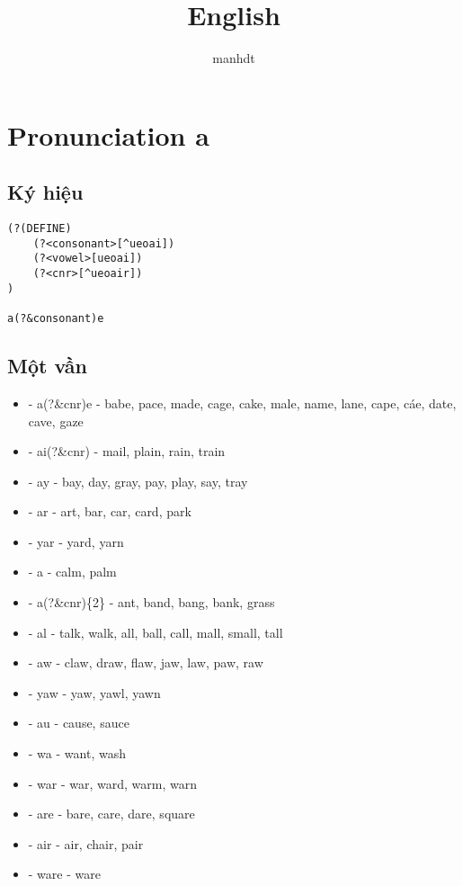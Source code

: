\documentclass[a4paper]{article}
\begin{document}
\title{English}
\author{manhdt}
\maketitle

\section{Pronunciation a}
\subsection{Ký hiệu}

\begin{lstlisting}
(?(DEFINE)
    (?<consonant>[^ueoai])
    (?<vowel>[ueoai])
    (?<cnr>[^ueoair])
)

a(?&consonant)e
\end{lstlisting}

\subsection{Một vần}
\begin{itemize}
    \item {}  - a(?\&cnr)e        - babe, pace, made, cage, cake, male, name, lane, cape, cáe, date, cave, gaze
    \item {}  - ai(?\&cnr)        - mail, plain, rain, train
    \item {}  - ay                - bay, day, gray, pay, play, say, tray
    \item {}  - ar                - art, bar, car, card, park
    \item {}  - yar               - yard, yarn
    \item {}  - a                 - calm, palm
    \item \textipa{\ae} - a(?\&cnr)\{2\}    - ant, band, bang, bank, grass  
    \item {}  - al                - talk, walk, all, ball, call, mall, small, tall
    \item {}  - aw                - claw, draw, flaw, jaw, law, paw, raw
    \item {}  - yaw               - yaw, yawl, yawn
    \item {}  - au                - cause, sauce
    \item {}  - wa                - want, wash
    \item {}  - war               - war, ward, warm, warn
    \item {}  - are               - bare, care, dare, square
    \item {}  - air               - air, chair, pair
    \item {}  - ware              - ware
\end{itemize}
\end{document}
